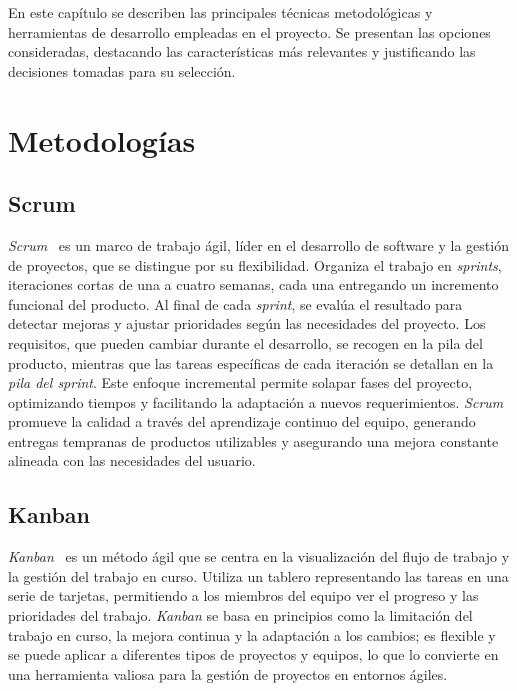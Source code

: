 
En este capítulo se describen las principales técnicas metodológicas y herramientas de desarrollo empleadas en el proyecto. Se presentan las opciones consideradas, destacando las características más relevantes y justificando las decisiones tomadas para su selección.

\section{Metodologías}

\subsection{Scrum}

\textit{Scrum}~\cite{wiki:Scrum} es un marco de trabajo ágil, líder en el desarrollo de software y la gestión de proyectos, 
que se distingue por su flexibilidad. Organiza el trabajo en \textit{sprints}, iteraciones cortas de una a cuatro 
semanas, cada una entregando un incremento funcional del producto. 
Al final de cada \textit{sprint}, se evalúa el resultado para detectar mejoras 
y ajustar prioridades según las necesidades del proyecto. Los requisitos, que pueden cambiar durante el 
desarrollo, se recogen en la pila del producto, mientras que las tareas específicas de cada iteración se 
detallan en la \textit{pila del sprint}. Este enfoque incremental permite solapar fases del proyecto, optimizando 
tiempos y facilitando la adaptación a nuevos requerimientos. \textit{Scrum} promueve la calidad a través del
aprendizaje continuo del equipo, generando entregas tempranas de productos utilizables y asegurando una 
mejora constante alineada con las necesidades del usuario.

\subsection{Kanban}

\textit{Kanban}~\cite{wiki:Kanban} es un método ágil que se centra en la visualización del flujo de trabajo y la gestión del
trabajo en curso. Utiliza un tablero representando las tareas en una serie de tarjetas, permitiendo a los
miembros del equipo ver el progreso y las prioridades del trabajo.
\textit{Kanban} se basa en principios como la limitación del trabajo en curso, la mejora continua y la
adaptación a los cambios; es flexible y se puede aplicar a diferentes tipos de proyectos y equipos,
lo que lo convierte en una herramienta valiosa para la gestión de proyectos en entornos ágiles.

